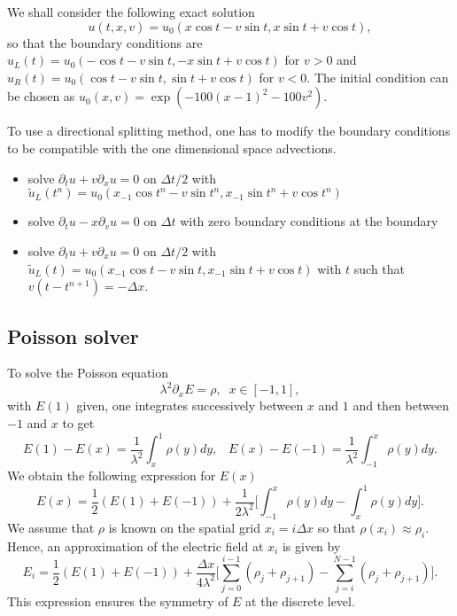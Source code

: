 \documentclass[12pt,english]{article}
\theoremstyle{plain}\newtheorem{theorem}{Theorem}[section]
\theoremstyle{plain}\newtheorem{corollary}{Corollary}[section]
\theoremstyle{plain}\newtheorem{lemma}{Lemma}[section]
\begin{document}
We shall consider the following exact solution 
$$
u(t, x, v) = u_0(x\cos t - v\sin t , x\sin t +v\cos t), 
$$
so that the boundary conditions are $u_L(t) = u_0(-\cos t -v\sin t, -x\sin t +v\cos t)$ for $v> 0$ 
and $u_R(t) = u_0(\cos t -v\sin t, \sin t +v\cos t)$ for $v< 0$. The initial condition can be chosen as 
$u_0(x, v) = \exp( - 100 (x-1)^2 - 100 v^2)$.  

To use a directional splitting method, one has to modify the boundary conditions to be compatible 
with the one dimensional space advections. 
\begin{itemize}
\item solve $\partial_t u +v \partial_x u = 0$ on $\Delta t/2$ 
with $\tilde{u}_L(t^n) = u_0(x_{-1}\cos t^n - v\sin t^n , x_{-1}\sin t^n +v\cos t^n)$
\item solve $\partial_t u -x \partial_v u = 0$ on $\Delta t$ with zero boundary conditions at the boundary 
\item solve $\partial_t u +v \partial_x u = 0$ on $\Delta t/2$ with $\tilde{u}_L(t) = u_0(x_{-1}\cos t - v\sin t , x_{-1}\sin t +v\cos t)$ with 
$t$ such that $v(t-t^{n+1}) = -\Delta x$. 
\end{itemize}


\subsection{Poisson solver}
\label{poisson}
To solve the Poisson equation 
$$
\lambda^2\partial_x E = \rho, \;\; x\in [-1, 1], 
$$
with $E(1)$ given, one integrates successively between $x$ and $1$ and then between $-1$ and $x$ to get 
$$
E(1) - E(x) = \frac{1}{\lambda^2} \int_x^1 \rho(y) dy, \;\;\; E(x) - E(-1) = \frac{1}{\lambda^2} \int_{-1}^x \rho(y) dy. 
$$
We obtain the following expression for $E(x)$ 
$$
E(x) = \frac{1}{2}(E(1)+E(-1)) + \frac{1}{2\lambda^2} \Big[\int_{-1}^x \rho(y) dy - \int_x^1 \rho(y) dy \Big]. 
$$
We assume that $\rho$ is known on the spatial grid $x_i=i\Delta x$ so that $\rho(x_i) \approx \rho_i$. 
Hence, an approximation of the electric field at $x_i$ is given by 
$$
E_i = \frac{1}{2}(E(1)+E(-1)) + \frac{\Delta x}{4\lambda^2} \Big[\sum_{j=0}^{i-1} (\rho_j+\rho_{j+1})  - \sum_{j=i}^{N-1}(\rho_j+\rho_{j+1}) \Big].
$$
This expression ensures the symmetry of $E$ at the discrete level.

\end{document}
